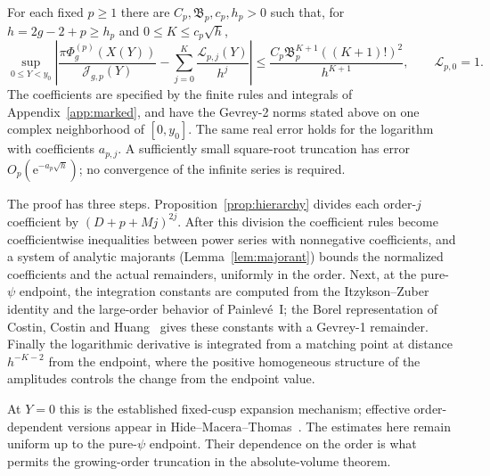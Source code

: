 \begin{theorem}\label{thm:full-expansion}
For each fixed $p\ge1$ there are $C_p,\mathfrak B_p,c_p,h_p>0$ such that,
for $h=2g-2+p\ge h_p$ and $0\le K\le c_p\sqrt h$,
\begin{equation}
 \sup_{0\le Y<y_0}\left|
 \frac{\pi\Phi_g^{(p)}(X(Y))}{\mathcal J_{g,p}(Y)}
       -\sum_{j=0}^K\frac{\mathcal L_{p,j}(Y)}{h^j}\right|
 \le\frac{C_p\mathfrak B_p^{K+1}((K+1)!)^2}{h^{K+1}},
 \qquad \mathcal L_{p,0}=1.
 \label{eq:FE12}
\end{equation}
The coefficients are specified by the finite rules and integrals of
Appendix~\ref{app:marked}, and have the Gevrey-2 norms stated above on
one complex neighborhood of $[0,y_0]$. The same real error holds for the
logarithm with coefficients $a_{p,j}$. A sufficiently small square-root
truncation has error $O_p(\mathrm{e}^{-a_p\sqrt h})$; no convergence of
the infinite series is required.
\end{theorem}

The proof has three steps. Proposition~\ref{prop:hierarchy} divides each
order-$j$ coefficient by $(D+p+Mj)^{2j}$. After this division the
coefficient rules become coefficientwise inequalities between power
series with nonnegative coefficients, and a system of analytic majorants
(Lemma~\ref{lem:majorant}) bounds the normalized coefficients and the
actual remainders, uniformly in the order. Next, at the pure-$\psi$
endpoint, the integration constants are computed from the
Itzykson--Zuber identity and the large-order behavior of Painlev\'e~I;
the Borel representation of Costin, Costin and Huang~\cite{CCH} gives
these constants with a Gevrey-1 remainder. Finally the logarithmic
derivative is integrated from a matching point at distance $h^{-K-2}$
from the endpoint, where the positive homogeneous structure of the
amplitudes controls the change from the endpoint value.

At $Y=0$ this is the established fixed-cusp expansion mechanism;
effective order-dependent versions appear in
Hide--Macera--Thomas~\cite[Theorem~4.2]{HMT}. The estimates here remain
uniform up to the pure-$\psi$ endpoint. Their dependence on the order is
what permits the growing-order truncation in the absolute-volume theorem.
